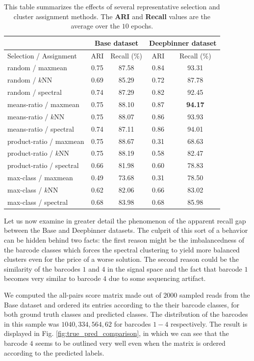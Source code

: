 \begin{table}[!htbp]
\centering
\begin{tabular}{lcccc}
\toprule
 &  \multicolumn{2}{c}{Base dataset} & \multicolumn{2}{c}{Deepbinner dataset}\\
\midrule
Selection / Assignment & ARI   & Recall (\%) & ARI & Recall (\%) \\
\hline
random / maxmean & 0.75 & 87.58 & 0.84 & 93.31  \\
random / $k$NN & 0.69 & 85.29 & 0.72 & 87.78 \\
random / spectral & 0.74 & 87.29 & 0.82 &  92.45 \\
means-ratio / maxmean & 0.75 & 88.10 & 0.87 & \textbf{94.17}  \\
means-ratio / $k$NN & 0.75 & 88.07 & 0.86 & 93.93 \\
means-ratio / spectral & 0.74 & 87.11 & 0.86 & 94.01 \\
product-ratio / maxmean & 0.75 & 88.67 & 0.31 & 68.63  \\
product-ratio / $k$NN & 0.75 & 88.19 & 0.58 & 82.47 \\
product-ratio / spectral & 0.66 & 81.98 & 0.60 & 78.83 \\
max-class / maxmean & 0.49 & 73.68 & 0.31 & 78.50  \\
max-class / $k$NN & 0.62 & 82.06 & 0.66 & 83.02 \\
max-class / spectral & 0.68 & 83.98 & 0.68 & 85.98 \\
\bottomrule
\end{tabular}
\caption[Representative selection and cluster assignment summary]{This table summarizes the effects of several representative selection and cluster assignment methods. The \textbf{ARI} and \textbf{Recall} values are the average over the $10$ epochs.}
\label{tab:grid_search}
\end{table}

Let us now examine in greater detail the phenomenon of the apparent recall gap between the Base and Deepbinner datasets. The culprit of this sort of a behavior can be hidden behind two facts: the first reason might be the imbalancedness of the barcode classes which forces the spectral clustering to yield more balanced clusters even for the price of a worse solution. The second reason could be the similarity of the barcodes $1$ and $4$ in the signal space and the fact that barcode $1$ becomes very similar to barcode $4$ due to some sequencing artifact.

We computed the all-pairs score matrix made out of $2000$ sampled reads from the Base dataset and ordered its entries according to the their barcode classes, for both ground truth classes and predicted classes. The distribution of the barcodes in this sample was $1040,  334,  564,   62$ for barcodes $1-4$ respectively. The result is displayed in Fig. \ref{fig:true_pred_comparison}, in which we can see that the barcode $4$ seems to be outlined very well even when the matrix is ordered according to the predicted labels.

